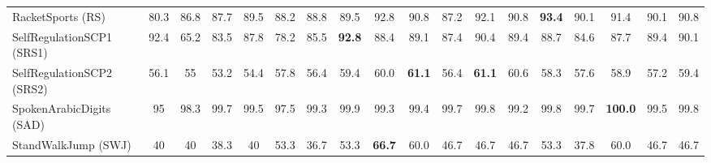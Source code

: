 \documentclass[journal]{IEEEtran}
\begin{document}
\begin{table*}[!t]
\begin{tabular}{l|c|c|c|c|c|cccc|cccc|cccc|}
RacketSports (RS) & 80.3  & 86.8  & 87.7  & 89.5  & 88.2  & \textcolor[rgb]{ 1,  0,  0}{88.8} & \textcolor[rgb]{ .188,  .329,  .588}{89.5} & \textcolor[rgb]{ .188,  .329,  .588}{92.8} & \textcolor[rgb]{ .188,  .329,  .588}{90.8} & \textcolor[rgb]{ 1,  0,  0}{87.2} & \textcolor[rgb]{ .776,  .349,  .067}{92.1} & \textcolor[rgb]{ .776,  .349,  .067}{90.8} & \textcolor[rgb]{ .776,  .349,  .067}{\textbf{93.4}} & \textcolor[rgb]{ 1,  0,  0}{90.1} & \textcolor[rgb]{ .439,  .678,  .278}{91.4} & 90.1  & \textcolor[rgb]{ .439,  .678,  .278}{90.8} \\
SelfRegulationSCP1 (SRS1) & 92.4  & 65.2  & 83.5  & 87.8  & 78.2  & \textcolor[rgb]{ 1,  0,  0}{85.5} & \textcolor[rgb]{ .188,  .329,  .588}{\textbf{92.8}} & \textcolor[rgb]{ .188,  .329,  .588}{88.4} & \textcolor[rgb]{ .188,  .329,  .588}{89.1} & \textcolor[rgb]{ 1,  0,  0}{87.4} & \textcolor[rgb]{ .776,  .349,  .067}{90.4} & \textcolor[rgb]{ .776,  .349,  .067}{89.4} & \textcolor[rgb]{ .776,  .349,  .067}{88.7} & \textcolor[rgb]{ 1,  0,  0}{84.6} & \textcolor[rgb]{ .439,  .678,  .278}{87.7} & \textcolor[rgb]{ .439,  .678,  .278}{89.4} & \textcolor[rgb]{ .439,  .678,  .278}{90.1} \\
SelfRegulationSCP2 (SRS2) & 56.1  & 55    & 53.2  & 54.4  & 57.8  & \textcolor[rgb]{ 1,  0,  0}{56.4} & \textcolor[rgb]{ .188,  .329,  .588}{59.4} & \textcolor[rgb]{ .188,  .329,  .588}{60.0} & \textcolor[rgb]{ .188,  .329,  .588}{\textbf{61.1}} & \textcolor[rgb]{ 1,  0,  0}{56.4} & \textcolor[rgb]{ .776,  .349,  .067}{\textbf{61.1}} & \textcolor[rgb]{ .776,  .349,  .067}{60.6} & \textcolor[rgb]{ .776,  .349,  .067}{58.3} & \textcolor[rgb]{ 1,  0,  0}{57.6} & \textcolor[rgb]{ .439,  .678,  .278}{58.9} & 57.2  & \textcolor[rgb]{ .439,  .678,  .278}{59.4} \\
SpokenArabicDigits (SAD) & 95    & 98.3  & 99.7  & 99.5  & 97.5  & \textcolor[rgb]{ 1,  0,  0}{99.3} & \textcolor[rgb]{ .188,  .329,  .588}{99.9} & 99.3  & \textcolor[rgb]{ .188,  .329,  .588}{99.4} & \textcolor[rgb]{ 1,  0,  0}{99.7} & \textcolor[rgb]{ .776,  .349,  .067}{99.8} & 99.2  & \textcolor[rgb]{ .776,  .349,  .067}{99.8} & \textcolor[rgb]{ 1,  0,  0}{99.7} & \textcolor[rgb]{ .439,  .678,  .278}{\textbf{100.0}} & 99.5  & \textcolor[rgb]{ .439,  .678,  .278}{99.8} \\
StandWalkJump (SWJ) & 40    & 40    & 38.3  & 40    & 53.3  & \textcolor[rgb]{ 1,  0,  0}{36.7} & \textcolor[rgb]{ .188,  .329,  .588}{53.3} & \textcolor[rgb]{ .188,  .329,  .588}{\textbf{66.7}} & \textcolor[rgb]{ .188,  .329,  .588}{60.0} & \textcolor[rgb]{ 1,  0,  0}{46.7} & \textcolor[rgb]{ .776,  .349,  .067}{46.7} & \textcolor[rgb]{ .776,  .349,  .067}{46.7} & \textcolor[rgb]{ .776,  .349,  .067}{53.3} & \textcolor[rgb]{ 1,  0,  0}{37.8} & \textcolor[rgb]{ .439,  .678,  .278}{60.0} & \textcolor[rgb]{ .439,  .678,  .278}{46.7} & \textcolor[rgb]{ .439,  .678,  .278}{46.7} \\

\end{tabular}
\end{table*}
\end{document}
